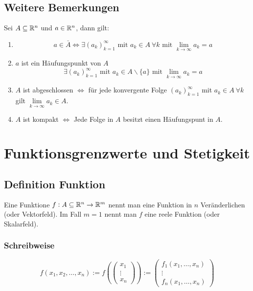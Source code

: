 \subsection{Weitere Bemerkungen}
Sei $A \subseteq  \mathbb{R}^n$ und $a \in \mathbb{R}^n$, dann gilt:
\begin{enumerate}[label= (\alph*)]
    \item
        \begin{equation*}
            a \in \bar{A} \Leftrightarrow \exists {(a_k)}_{k=1}^\infty
            \text{ mit } a_k \in A\ \forall k \text{ mit } \lim_{k \rightarrow \infty}
            a_k = a
        \end{equation*}
    \item $a$ ist ein Häufungspunkt von $A$
        \begin{equation*}
            \exists {(a_k)}_{k=1}^\infty \text{ mit } a_k \in A \backslash \{a\}
            \text{ mit } \lim_{k \rightarrow \infty} a_k = a
        \end{equation*}
    \item $A$ ist abgeschlossen $\Leftrightarrow$ für jede konvergente Folge
        ${(a_k)}_{k=1}^\infty$ mit $a_k \in A\ \forall k$ gilt
        $\lim\limits_{k \rightarrow \infty} a_k \in A$.
    \item $A$ ist kompakt $\Leftrightarrow$ Jede Folge in $A$ besitzt einen
        Häufungspunt in $A$.
\end{enumerate}

\section{Funktionsgrenzwerte und Stetigkeit}

\subsection{Definition Funktion}
Eine Funktione $f: A \subseteq \mathbb{R}^n \rightarrow \mathbb{R}^m$ nennt man eine Funktion in
$n$ Veränderlichen (oder Vektorfeld).
Im Fall $m=1$ nennt man $f$ eine reele Funktion (oder Skalarfeld).

\subsubsection{Schreibweise}
\begin{equation*}
    f(x_1, x_2, \ldots, x_n) :=
    f\left(\begin{pmatrix}
        x_1\\
        \vdots \\
        x_n
    \end{pmatrix} \right) :=
    \begin{pmatrix}
        f_1(x_1, \ldots, x_n)\\
        \vdots \\
        f_n(x_1, \ldots, x_n)
    \end{pmatrix}
\end{equation*}

